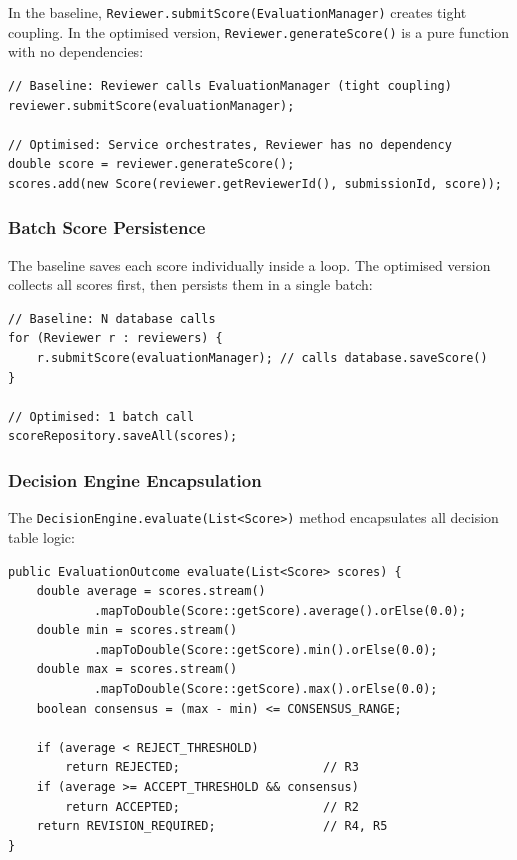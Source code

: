 \documentclass[12pt, a4paper]{article}
\begin{document}
In the baseline, \texttt{Reviewer.submitScore(EvaluationManager)} creates tight coupling. In the optimised version, \texttt{Reviewer.generateScore()} is a pure function with no dependencies:

\begin{lstlisting}
// Baseline: Reviewer calls EvaluationManager (tight coupling)
reviewer.submitScore(evaluationManager);

// Optimised: Service orchestrates, Reviewer has no dependency
double score = reviewer.generateScore();
scores.add(new Score(reviewer.getReviewerId(), submissionId, score));
\end{lstlisting}

\subsubsection{Batch Score Persistence}

The baseline saves each score individually inside a loop. The optimised version collects all scores first, then persists them in a single batch:

\begin{lstlisting}
// Baseline: N database calls
for (Reviewer r : reviewers) {
    r.submitScore(evaluationManager); // calls database.saveScore()
}

// Optimised: 1 batch call
scoreRepository.saveAll(scores);
\end{lstlisting}

\subsubsection{Decision Engine Encapsulation}

The \texttt{DecisionEngine.evaluate(List<Score>)} method encapsulates all decision table logic:

\begin{lstlisting}
public EvaluationOutcome evaluate(List<Score> scores) {
    double average = scores.stream()
            .mapToDouble(Score::getScore).average().orElse(0.0);
    double min = scores.stream()
            .mapToDouble(Score::getScore).min().orElse(0.0);
    double max = scores.stream()
            .mapToDouble(Score::getScore).max().orElse(0.0);
    boolean consensus = (max - min) <= CONSENSUS_RANGE;

    if (average < REJECT_THRESHOLD)
        return REJECTED;                    // R3
    if (average >= ACCEPT_THRESHOLD && consensus)
        return ACCEPTED;                    // R2
    return REVISION_REQUIRED;               // R4, R5
}
\end{lstlisting}
\end{document}
